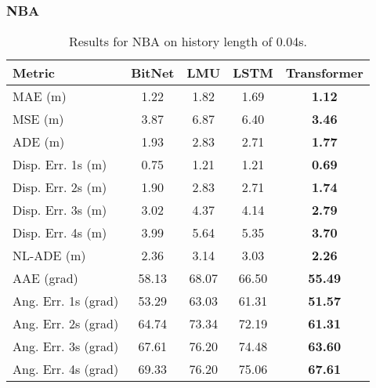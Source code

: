 \subsubsection{NBA}
\begin{table}[H]
\centering
\caption{Results for NBA on history length of 0.04s.}
\label{hist:NBA_0.04s}
\begin{tabular}{l||c|c|c|c}
Metric & BitNet & LMU & LSTM & Transformer \\
\hline \hline 
MAE (m) & 1.22 & 1.82 & 1.69 & \textbf{1.12} \\
MSE (m) & 3.87 & 6.87 & 6.40 & \textbf{3.46} \\
ADE (m) & 1.93 & 2.83 & 2.71 & \textbf{1.77} \\
Disp. Err. 1s (m) & 0.75 & 1.21 & 1.21 & \textbf{0.69} \\
Disp. Err. 2s (m) & 1.90 & 2.83 & 2.71 & \textbf{1.74} \\
Disp. Err. 3s (m) & 3.02 & 4.37 & 4.14 & \textbf{2.79} \\
Disp. Err. 4s (m) & 3.99 & 5.64 & 5.35 & \textbf{3.70} \\
NL-ADE (m) & 2.36 & 3.14 & 3.03 & \textbf{2.26} \\
AAE (grad) & 58.13 & 68.07 & 66.50 & \textbf{55.49} \\
Ang. Err. 1s (grad) & 53.29 & 63.03 & 61.31 & \textbf{51.57} \\
Ang. Err. 2s (grad) & 64.74 & 73.34 & 72.19 & \textbf{61.31} \\
Ang. Err. 3s (grad) & 67.61 & 76.20 & 74.48 & \textbf{63.60} \\
Ang. Err. 4s (grad) & 69.33 & 76.20 & 75.06 & \textbf{67.61} \\
\end{tabular}
\end{table}

